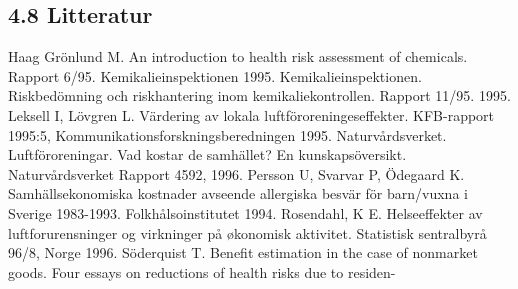 \subsection*{4.8 Litteratur}
Haag Grönlund M. An introduction to health risk assessment of chemicals. Rapport 6/95. Kemikalieinspektionen 1995.
Kemikalieinspektionen. Riskbedömning och riskhantering inom kemikaliekontrollen. Rapport 11/95. 1995.
Leksell I, Lövgren L. Värdering av lokala luftföroreningeseffekter. KFB-rapport 1995:5, Kommunikationsforskningsberedningen 1995.
Naturvårdsverket. Luftföroreningar. Vad kostar de samhället? En kunskapsöversikt. Naturvårdsverket Rapport 4592, 1996.
Persson U, Svarvar P, Ödegaard K. Samhällsekonomiska kostnader avseende allergiska besvär för barn/vuxna i Sverige 1983-1993. Folkhålsoinstitutet 1994.
Rosendahl, K E. Helseeffekter av luftforurensninger og virkninger på økonomisk aktivitet. Statistisk sentralbyrå 96/8, Norge 1996.
Söderquist T. Benefit estimation in the case of nonmarket goods. Four essays on reductions of health risks due to residen-

